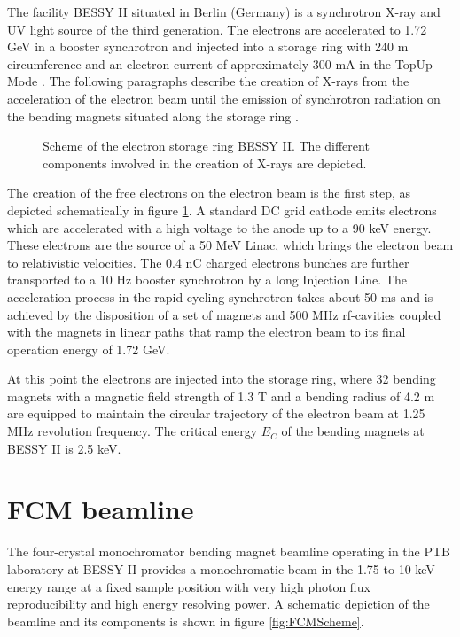 The facility BESSY II situated in Berlin (Germany) is a synchrotron X-ray and UV light source of the third generation. The electrons are accelerated to 1.72 GeV in a booster synchrotron and injected into a storage ring with 240 m circumference and an electron current of approximately 300 mA in the TopUp Mode \citep{couprie_x_2008}. The following paragraphs describe the creation of X-rays from the acceleration of the electron beam until the emission of synchrotron radiation on the bending magnets situated along the storage ring \citep{bakker_orbit_1998, bakker_status_1999}.

\begin{figure}%
\centering
\def\svgwidth{0.75\linewidth}

\caption[Scheme of the electron storage ring BESSY II.]{Scheme of the electron storage ring BESSY II. The different components involved in the creation of X-rays are depicted.}
\label{fig:BessyScheme}
\end{figure}



The creation of the free electrons on the electron beam is the first step, as depicted schematically in figure \ref{fig:BessyScheme}. A standard DC grid cathode emits electrons which are accelerated with a high voltage to the anode up to a 90 keV energy. These electrons are the source of a 50 MeV Linac, which brings the electron beam to relativistic velocities. The 0.4 nC charged electrons bunches are further transported to a 10 Hz booster synchrotron by a long Injection Line. The acceleration process in the rapid-cycling synchrotron takes about 50 ms and is achieved by the disposition of a set of magnets and 500 MHz rf-cavities coupled with the magnets in linear paths that ramp the electron beam to its final operation energy of 1.72 GeV.

At this point the electrons are injected into the storage ring, where 32 bending magnets with a magnetic field strength of 1.3 T and a bending radius of 4.2 m \citep{klein_elektronenspeicherringe_2014} are equipped to maintain the circular trajectory of the electron beam at 1.25 MHz revolution frequency. The critical energy $E_C$ of the bending magnets at BESSY II is 2.5 keV. 


\section{FCM beamline}
\label{sec:fcm}

The four-crystal monochromator bending magnet beamline operating in the PTB laboratory at BESSY II \citep{krumrey_design_1998, krumrey_high-accuracy_2001} provides a monochromatic beam in the 1.75 to 10 keV energy range at a fixed sample position with very high photon flux reproducibility and high energy resolving power. A schematic depiction of the beamline and its components is shown in figure \ref{fig:FCMScheme}.

